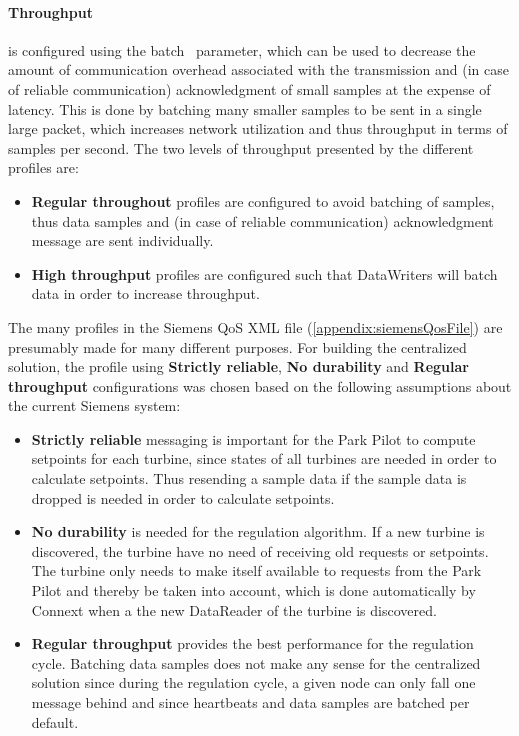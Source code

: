 \paragraph{Throughput} is configured using the batch~\cite{rtiConnextUsersManual} parameter, which can be used to decrease the amount of communication overhead associated with the transmission and (in case of reliable communication) acknowledgment of small samples at the expense of latency. This is done by batching many smaller samples to be sent in a single large packet, which increases network utilization and thus throughput in terms of samples per second. The two levels of throughput presented by the different profiles are:

\begin{itemize}
	\item \textbf{Regular throughout} profiles are configured to avoid batching of samples, thus data samples and (in case of reliable communication) acknowledgment message are sent individually.
	\item \textbf{High throughput} profiles are configured such that DataWriters will batch data in order to increase throughput.
\end{itemize}

The many profiles in the Siemens QoS XML file (\cref{appendix:siemensQosFile}) are presumably made for many different purposes. For building the centralized solution, the profile using \textbf{Strictly reliable}, \textbf{No durability} and \textbf{Regular throughput} configurations was chosen based on the following assumptions about the current Siemens system:

\begin{itemize}
	\item \textbf{Strictly reliable} messaging is important for the Park Pilot to compute setpoints for each turbine, since states of all turbines are needed in order to calculate setpoints. Thus resending a sample data if the sample data is dropped is needed in order to calculate setpoints. 
	\item \textbf{No durability} is needed for the regulation algorithm. If a new turbine is discovered, the turbine have no need of receiving old requests or setpoints. The turbine only needs to make itself available to requests from the Park Pilot and thereby be taken into account, which is done automatically by Connext when a the new DataReader of the turbine is discovered.  
	\item \textbf{Regular throughput} provides the best performance for the regulation cycle. Batching data samples does not make any sense for the centralized solution since during the regulation cycle, a given node can only fall one message behind and since heartbeats and data samples are batched per default.
\end{itemize}

